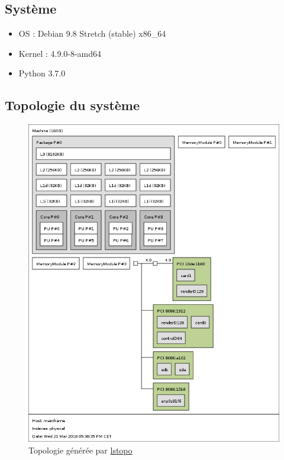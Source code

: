 \documentclass{report}
\begin{document}
    \subsection{Système}
      \begin{itemize}[label=$\bullet$]
      \item OS : Debian 9.8 Stretch (stable) x86\_64
      \item Kernel :  4.9.0-8-amd64
      \item Python 3.7.0
    \end{itemize}
  \subsection{Topologie du système}
    \begin{figure}[ht!]
      \centering
      \includegraphics[scale=0.35]{resources/lstopo.png}
      \caption{Topologie générée par \href{https://manpages.debian.org/jessie/hwloc/lstopo.1.en.html}{lstopo}}
    \end{figure}
\newpage
\end{document}
